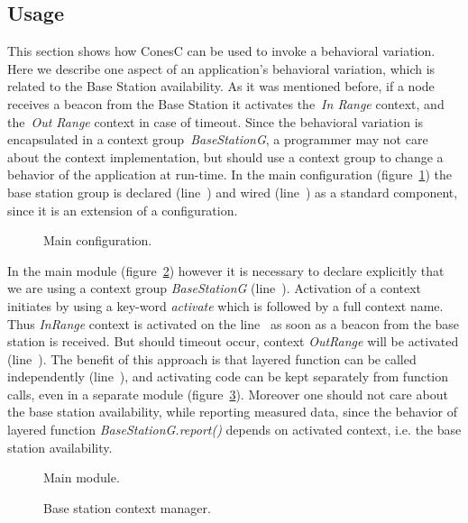 \subsection{Usage}

This section shows how ConesC can be used to invoke a behavioral
variation. Here we describe one aspect of an application's behavioral variation,
which is related to the Base Station availability. As it was mentioned before,
if a node receives a beacon from the Base Station it activates the~\emph{In Range}
context, and the~\emph{Out Range} context in case of timeout.
Since the behavioral variation is encapsulated in a context group~\emph{BaseStationG},
a programmer may not care about the context implementation, but should use a context group
to change a behavior of the application at run-time. In the main
configuration (figure~\ref{fig:mc}) the base station group is declared
(line~) and wired (line~) as a standard
component, since it is an extension of a configuration.


\begin{figure}[!h]
\TheSbox
\caption{Main configuration.}
\label{fig:mc}
\end{figure}

In the main module (figure~\ref{fig:mm}) however it is necessary to declare
explicitly that we are using a context group \emph{BaseStationG}
(line~). Activation of a context initiates by using a key-word
\emph{activate} which is followed by a full context name. Thus
\emph{InRange} context is activated on the line~ as soon as a
beacon from the base station is received. But should timeout occur, context
\emph{OutRange} will be activated (line~). The benefit of
this approach is that layered function can be called independently
(line~), and activating code can be kept separately from function
calls, even in a separate module (figure~\ref{fig:bscm}).
Moreover one should not care about the base station availability, while
reporting measured data, since the behavior of layered function
\emph{BaseStationG.report()} depends on activated context, i.e. the base
station availability.


\begin{figure}[!h]
\TheSbox
\caption{Main module.}
\label{fig:mm}
\end{figure}


\begin{figure}[!h]
\TheSbox
\caption{Base station context manager.}
\label{fig:bscm}
\end{figure}

